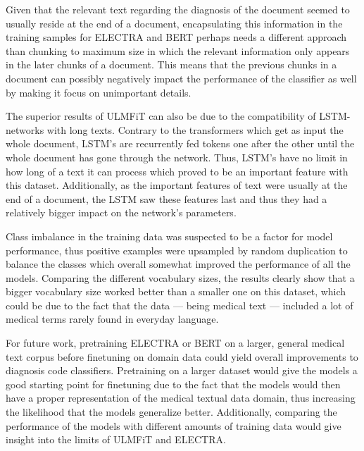 Given that the relevant text regarding the diagnosis of the document seemed to usually reside at the end of a document, encapsulating this information in the training samples for ELECTRA and BERT perhaps needs a different approach than chunking to maximum size in which the relevant information only appears in the later chunks of a document.
This means that the previous chunks in a document can possibly negatively impact the performance of the classifier as well by making it focus on unimportant details.


The superior results of ULMFiT can also be due to the compatibility of LSTM-networks with long texts.
Contrary to the transformers which get as input the whole document, LSTM's are recurrently fed tokens one after the other until the whole document has gone through the network.
Thus, LSTM's have no limit in how long of a text it can process which proved to be an important feature with this dataset.
Additionally, as the important features of text were usually at the end of a document, the LSTM saw these features last and thus they had a relatively bigger impact on the network's parameters.


Class imbalance in the training data was suspected to be a factor for model performance, thus positive examples were upsampled by random duplication to balance the classes which overall somewhat improved the performance of all the models.
Comparing the different vocabulary sizes, the results clearly show that a bigger vocabulary size worked better than a smaller one on this dataset, which could be due to the fact that the data --- being medical text --- included a lot of medical terms rarely found in everyday language.

For future work, pretraining ELECTRA or BERT on a larger, general medical text corpus before finetuning on domain data could yield overall improvements to diagnosis code classifiers.
Pretraining on a larger dataset would give the models a good starting point for finetuning due to the fact that the models would then have a proper representation of the medical textual data domain, thus increasing the likelihood that the models generalize better.
Additionally, comparing the performance of the models with different amounts of training data would give insight into the limits of ULMFiT and ELECTRA.
